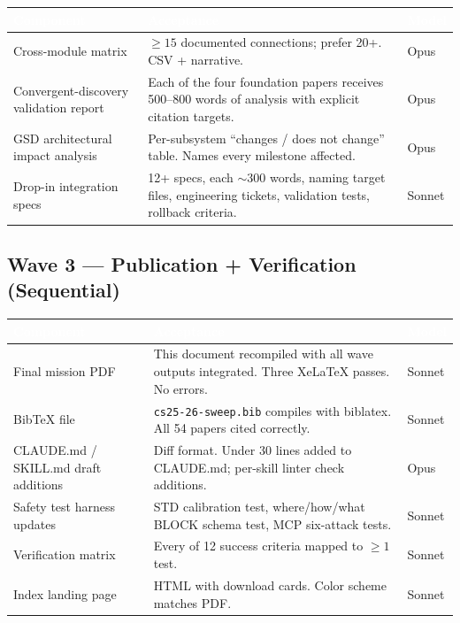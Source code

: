 \documentclass[11pt,letterpaper]{article}
\newcommand{\tableheader}[1]{\textbf{\sffamily\textcolor{white}{#1}}}
\begin{document}
\begin{center}
\begin{tabularx}{\textwidth}{L{4cm}XC{1.5cm}}
\toprule
{}
\tableheader{Component} & \tableheader{Acceptance} & \tableheader{Model} \\
\midrule
Cross-module matrix & ${\geq}15$ documented connections; prefer 20+. CSV + narrative. & Opus \\
Convergent-discovery validation report & Each of the four foundation papers receives 500--800 words of analysis with explicit citation targets. & Opus \\
GSD architectural impact analysis & Per-subsystem ``changes / does not change'' table. Names every milestone affected. & Opus \\
Drop-in integration specs & 12+ specs, each ${\sim}300$ words, naming target files, engineering tickets, validation tests, rollback criteria. & Sonnet \\
\bottomrule
\end{tabularx}
\end{center}

\subsection{Wave 3 --- Publication + Verification (Sequential)}

\begin{center}
\begin{tabularx}{\textwidth}{L{4cm}XC{1.5cm}}
\toprule
{}
\tableheader{Component} & \tableheader{Acceptance} & \tableheader{Model} \\
\midrule
Final mission PDF & This document recompiled with all wave outputs integrated. Three XeLaTeX passes. No errors. & Sonnet \\
BibTeX file & \texttt{cs25-26-sweep.bib} compiles with biblatex. All 54 papers cited correctly. & Sonnet \\
CLAUDE.md / SKILL.md draft additions & Diff format. Under 30 lines added to CLAUDE.md; per-skill linter check additions. & Opus \\
Safety test harness updates & STD calibration test, where/how/what BLOCK schema test, MCP six-attack tests. & Sonnet \\
Verification matrix & Every of 12 success criteria mapped to ${\geq}1$ test. & Sonnet \\
Index landing page & HTML with download cards. Color scheme matches PDF. & Sonnet \\
\bottomrule
\end{tabularx}
\end{center}
\end{document}
